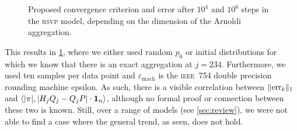 \documentclass[runningheads]{llncs}
\newcommand*{\errvec}{\mathrm{err}}
\newcommand*{\abbrev}[1]{\textsc{#1}}
\DeclarePairedDelimiter{\abs}{\lvert}{\rvert}
\DeclarePairedDelimiter{\norm}{\lVert}{\rVert}
\DeclarePairedDelimiter{\inp}{\langle}{\rangle}
\begin{document}
\begin{figure}[ht]
    \caption{Proposed convergence criterion and error after $10^4$ and $10^6$ steps in the \abbrev{rsvp} model, depending on the dimension of the Arnoldi aggregation.}
    \label{fig:rsvp-conv-crit}
\end{figure}

This results in \cref{fig:rsvp-conv-crit}, where we either used random $p_0$ or initial distributions for which we know that there is an exact aggregation at $j = 234$.
Furthermore, we used ten samples per data point and $\varepsilon_\mathrm{mach}$ is the \abbrev{ieee~754} double precision rounding machine epsilon.
As such, there is a visible correlation between $\norm{\errvec_k}_1$ and $\inp*{\abs{\pi}, \abs{H_j Q_j - Q_j P} \cdot \mathbf{1}_n}$, although no formal proof or connection between these two is known.
Still, over a range of models (see \cref{sec:review}), we were not able to find a case where the general trend, as seen, does not hold.
\end{document}
